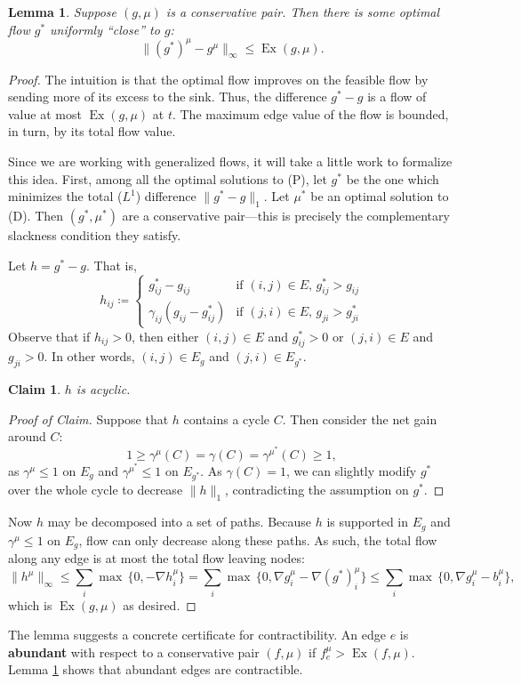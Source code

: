 \documentclass[11pt]{article}
\newtheorem{lemma}[theorem]{Lemma}
\newtheorem{claim}[theorem]{Claim}
\theoremstyle{definition}
\theoremstyle{definition}
\theoremstyle{definition}
\newcommand{\biu}{b_{i}^{\mu}}
\newcommand{\gij}{\gamma_{ij}}
\DeclareMathOperator{\Ex}{Ex}
\begin{document}
	\begin{lemma} \label{lem.bound-dist}
	Suppose $(g, \mu)$ is a conservative pair. Then there is some optimal flow $g^*$
    uniformly ``close'' to $g$:
    \[ \|(g^*)^\mu - g^\mu\|_\infty \leq \Ex(g, \mu). \]
    \end{lemma}
    \begin{proof}
    The intuition is that the optimal flow improves on the feasible flow by
    sending more of its excess to the sink. Thus, the difference $g^* - g$
    is a flow of value at most $\Ex(g, \mu)$ at $t$. The maximum edge value of
    the flow is bounded, in turn, by its total flow value.
    
	Since we are working with generalized flows, it will take a little work to formalize
	this idea. First, among all the optimal solutions to (P), let $g^*$ be the one
	which minimizes the total ($L^1$) difference $\|g^* - g\|_1$. Let $\mu^*$ be an
	optimal solution to (D). Then $(g^*, \mu^*)$ are a conservative pair---this is precisely
	the complementary slackness condition they satisfy.
	
	Let $h = g^* - g$. That is,
	\[ h_{ij} \coloneqq \begin{cases}
							g^*_{ij} - g_{ij} & \text{if } (i, j) \in E, \,
														   g^*_{ij} > g_{ij} \\
							\gij(g_{ij} - g^*_{ij}) & \text{if } (j, i) \in E, \,
																 g_{ji} > g^*_{ji}
						\end{cases} \]
    Observe that if $h_{ij} > 0$, then either $(i, j) \in E$ and $g^*_{ij} > 0$ or
    $(j, i) \in E$ and $g_{ji} > 0$. In other words,
    $(i, j) \in E_g$ and $(j, i) \in E_{g^*}$.
    
    \begin{claim} \label{claim:nocycles} $h$ is acyclic. \end{claim}
    \begin{proof}[Proof of Claim]
    Suppose that $h$ contains a cycle $C$. Then consider the net gain around $C$:
    \[ 1 \geq \gamma^\mu(C) = \gamma(C) = \gamma^{\mu^*}(C) \geq 1, \]
    as $\gamma^\mu \leq 1$ on $E_g$ and $\gamma^{\mu^*} \leq 1$ on $E_{g^*}$.
    As $\gamma(C) = 1$, we can slightly modify $g^*$ over the whole cycle to
    decrease $\|h\|_1$, contradicting the assumption on $g^*$.
    \end{proof}
    
    Now $h$ may be decomposed into a set of paths. Because $h$ is supported in $E_g$ and
    $\gamma^\mu \leq 1$ on $E_g$, flow can only decrease along these paths.
    As such, the total flow along any edge is at most the total flow leaving nodes:
    \[ \|h^\mu\|_\infty \leq \sum_i \max\,\{0, -\nabla h_i^\mu\}
     = \sum_i \max\,\{0, \nabla g_i^\mu - \nabla (g^*)_i^\mu\}
     \leq \sum_i \max\,\{0, \nabla g_i^\mu - \biu \}, \]
     which is $\Ex(g, \mu)$ as desired.
    \end{proof}
    The lemma suggests a concrete certificate for contractibility. An edge $e$ is
    \textbf{abundant} with respect to a conservative pair $(f, \mu)$
    if $f^\mu_e > \Ex(f, \mu)$.
    Lemma \ref{lem.bound-dist} shows that abundant edges are contractible.
    
\end{document}
